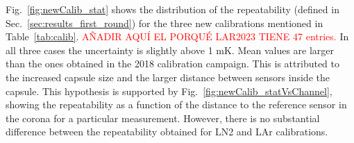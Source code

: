 Fig.~\ref{fig:newCalib_stat} shows the distribution of the repeatability (defined in Sec.~\ref{sec:results_first_round}) for the three new calibrations mentioned in Table~\ref{tab:calib}. \textcolor{red}{AÑADIR AQUÍ EL PORQUÉ LAR2023 TIENE 47 entries.} In all three cases the uncertainty is slightly above 1 mK. Mean values are larger than the ones obtained in the 2018 calibration campaign. This is attributed to the increased capsule size and the larger distance between sensors inside the capsule. This hypothesis is supported by Fig.~\ref{fig:newCalib_statVsChannel}, showing the repeatability as a function of the distance to the reference sensor in the corona for a particular measurement. However, there is no substantial difference between the repeatability obtained for LN2 and LAr calibrations.



